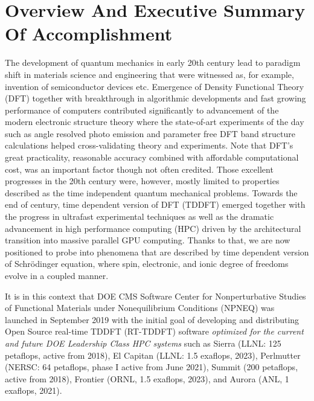 \section{Overview And Executive Summary Of Accomplishment}
\label{sec:overview}


The development of quantum mechanics in early 20th century lead to paradigm shift in materials science and engineering that were witnessed as, for example, invention of semiconductor devices etc. 
Emergence of Density Functional Theory (DFT)  together with breakthrough in algorithmic developments \cite{cooley1965,Martin1988} and fast growing performance of computers contributed significantly to advancement of the modern electronic structure theory where the state-of-art experiments of the day such as angle resolved photo emission and parameter free DFT band structure calculations helped cross-validating theory and experiments. 
Note that DFT's great practicality, reasonable accuracy combined with affordable computational cost, was an important factor though not often credited.
Those excellent progresses in the 20th century were, however, mostly limited to properties described as the time independent quantum mechanical problems. 
Towards the end of century, time dependent version of DFT (TDDFT) emerged \cite{RungeGross1984} together with the progress in ultrafast experimental techniques as well as the dramatic advancement in high performance computing (HPC) driven by the architectural transition into massive parallel GPU computing.
Thanks to that, we are now positioned to probe into phenomena that are described by time dependent version of Schr\"{o}dinger equation, where spin, electronic, and ionic degree of freedoms evolve in a coupled manner.

It is in this context that DOE CMS Software Center for Nonperturbative Studies of Functional Materials under Nonequilibrium Conditions (NPNEQ) was launched in September 2019 with the initial goal of developing and distributing Open Source real-time TDDFT (RT-TDDFT) software \emph{optimized for the current and future DOE Leadership Class HPC systems} such as 
	Sierra (LLNL: 125 petaflops, active from 2018), 
	El Capitan (LLNL: 1.5 exaflops, 2023), 
	Perlmutter (NERSC: 64 petaflops, phase I active from June 2021), 
	Summit (200 petaflops, active from 2018), 
	Frontier (ORNL, 1.5 exaflops, 2023), 
	and Aurora (ANL, 1 exaflops, 2021). 

